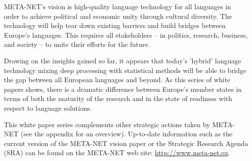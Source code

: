 \begin{multicols}{2}
META-NET’s vision is high-quality language technology for all languages in order to achieve political and economic unity through cultural diversity. The technology will help tear down existing barriers and build bridges between Europe’s languages. This requires all stakeholders -- in politics, research, business, and society -- to unite their efforts for the future.

Drawing on the insights gained so far, it appears that today’s 'hybrid' language technology mixing deep processing with statistical methods will be able to bridge the gap between all European languages and beyond. As this series of white papers shows, there is a dramatic difference between Europe’s member states in terms of both the maturity of the research and in the state of readiness with respect to language solutions.

This white paper series complements other strategic actions taken by META-NET (see the appendix for an overview). Up-to-date information such as the current version of the META-NET vision paper \cite{Vision} or the Strategic Research Agenda (SRA) can be found on the META-NET web site: \url{http://www.meta-net.eu}.
\end{multicols}

\clearpage


